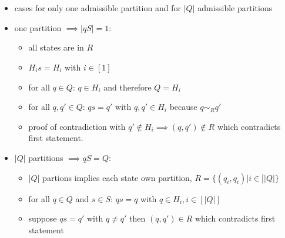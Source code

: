 \documentclass[a4paper,12pt,numbers=noenddot]{scrreport}
\begin{document}
\section{}
\begin{itemize}
    \item cases for only one admissible partition and for $|Q|$ admissible partitions
    \item one partition $\implies |qS| = 1$: 
        \begin{itemize}
            \item all states are in $R$
            \item $H_is = H_i$ with $i \in [1]$
            \item for all $q \in Q$: $q \in H_i$ and therefore $Q = H_i$
            \item for all $q,q' \in Q$: $qs = q'$ with $q,q' \in H_i$ because $q \sim_R q'$ 
            \item proof of contradiction with $q' \notin H_i \implies (q,q') \notin R$ which contradicts first statement.
        \end{itemize}
    \item $|Q|$ partitions $\implies qS = Q$:
        \begin{itemize}
            \item $|Q|$ partions implies each state own partition, $R = \{(q_i, q_i) | i \in [|Q|\}$
            \item for all $q \in Q$ and $s \in S$: $qs = q$ with $q \in H_i, i \in [|Q|]$
            \item suppose $qs = q'$ with $q \neq q'$ then $(q, q') \in R$ which contradicts first statement
        \end{itemize}
\end{itemize}

\section{}


\section{}
\end{document}
